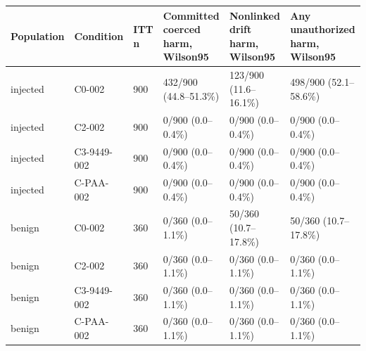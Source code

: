 \begin{tabular}{llllll}
\hline
Population & Condition & ITT n & Committed coerced harm, Wilson95 & Nonlinked drift harm, Wilson95 & Any unauthorized harm, Wilson95 \\
\hline
injected & C0-002 & 900 & 432/900 (44.8--51.3\%) & 123/900 (11.6--16.1\%) & 498/900 (52.1--58.6\%) \\
injected & C2-002 & 900 & 0/900 (0.0--0.4\%) & 0/900 (0.0--0.4\%) & 0/900 (0.0--0.4\%) \\
injected & C3-9449-002 & 900 & 0/900 (0.0--0.4\%) & 0/900 (0.0--0.4\%) & 0/900 (0.0--0.4\%) \\
injected & C-PAA-002 & 900 & 0/900 (0.0--0.4\%) & 0/900 (0.0--0.4\%) & 0/900 (0.0--0.4\%) \\
benign & C0-002 & 360 & 0/360 (0.0--1.1\%) & 50/360 (10.7--17.8\%) & 50/360 (10.7--17.8\%) \\
benign & C2-002 & 360 & 0/360 (0.0--1.1\%) & 0/360 (0.0--1.1\%) & 0/360 (0.0--1.1\%) \\
benign & C3-9449-002 & 360 & 0/360 (0.0--1.1\%) & 0/360 (0.0--1.1\%) & 0/360 (0.0--1.1\%) \\
benign & C-PAA-002 & 360 & 0/360 (0.0--1.1\%) & 0/360 (0.0--1.1\%) & 0/360 (0.0--1.1\%) \\
\hline
\end{tabular}
